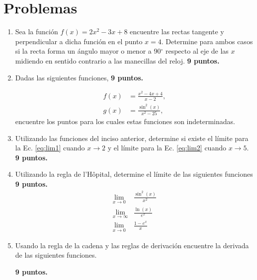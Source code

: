 \documentclass{article}
\begin{document}



\section{Problemas} %
\label{sec:problemas}

\begin{enumerate}

\item Sea la función $f(x)= 2x^{2} -3x + 8$ encuentre las rectas tangente y
perpendicular a dicha función en el punto $x=4$. Determine para ambos casos si
la recta forma un ángulo mayor o menor a 90$^{\circ}$ respecto al eje de las $x$
midiendo en sentido contrario a las manecillas del reloj.
\hfill \textbf{9 puntos.}

\item Dadas las siguientes funciones, 
\hfill \textbf{9 puntos.}

\begin{align}
f(x) &= \frac{x^{2} - 4x  + 4 }{x-2}, \label{eq:lim1}
\\
g(x) &= \frac{\sin^{2}(x)}{x^{2}-25}, \label{eq:lim2}
\end{align}
encuentre los puntos para los cuales estas funciones son indeterminadas.

\item Utilizando las funciones del inciso anterior, determine si existe el
límite para la Ec. \eqref{eq:lim1} cuando $x \rightarrow 2$ y el límite para la
Ec. \eqref{eq:lim2} cuando $x \rightarrow 5$. 
\hfill \textbf{9 puntos.}

\item Utilizando la regla de l'H\^opital, determine el límite de las siguientes
funciones
\hfill \textbf{9 puntos.}
\begin{align}
\label{eq:lop1}\lim_{x \rightarrow 0} &\frac{\sin^{2}(x)}{x^{2}}  \\
\label{eq:lop2}\lim_{x \rightarrow \infty} &\frac{\ln(x)}{e^x} \\
\label{eq:lop3}\lim_{x \rightarrow 0} &\frac{1-e^{x}}{x}
\end{align}

\item Usando la regla de la cadena y las reglas de derivación encuentre la
derivada de las siguientes funciones.

\hfill \textbf{9 puntos.}


\end{enumerate}
\end{document}
